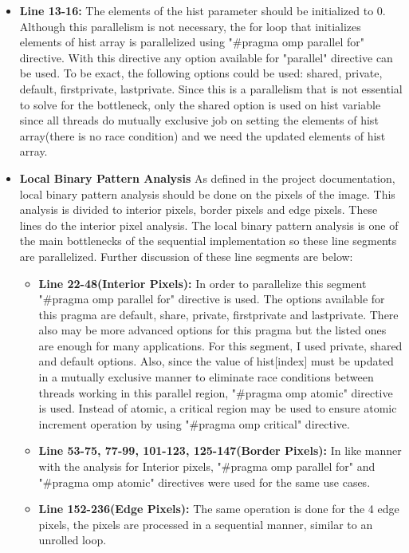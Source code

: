\documentclass{article}
\begin{document}
\begin{itemize}
    \item \textbf{Line 13-16:} The elements of the hist parameter should be initialized to 0. Although this parallelism is not necessary, the for loop that initializes elements of hist array is parallelized using "\#pragma omp parallel for" directive. With this directive any option available for "parallel" directive can be used. To be exact, the following options could be used: shared, private, default, firstprivate, lastprivate. Since this is a parallelism that is not essential to solve for the bottleneck, only the shared option is used on hist variable since all threads do mutually exclusive job on setting the elements of hist array(there is no race condition) and we need the updated elements of hist array.
    \item \textbf{Local Binary Pattern Analysis} As defined in the project documentation, local binary pattern analysis should be done on the pixels of the image. This analysis is divided to interior pixels, border pixels and edge pixels. These lines do the interior pixel analysis. The local binary pattern analysis is one of the main bottlenecks of the sequential implementation so these line segments are parallelized. Further discussion of these line segments are below:
    \begin{itemize}
        \item \textbf{Line 22-48(Interior Pixels):} In order to parallelize this segment "\#pragma omp parallel for" directive is used. The options available for this pragma are default, share, private, firstprivate and lastprivate. There also may be more advanced options for this pragma but the listed ones are enough for many applications. For this segment, I used private, shared and default options. Also, since the value of hist[index] must be updated in a mutually exclusive manner to eliminate race conditions between threads working in this parallel region, "\#pragma omp atomic" directive is used. Instead of atomic, a critical region may be used to ensure atomic increment operation by using "\#pragma omp critical" directive.
        \item \textbf{Line 53-75, 77-99, 101-123, 125-147(Border Pixels):} In like manner with the analysis for Interior pixels, "\#pragma omp parallel for" and "\#pragma omp atomic" directives were used for the same use cases.
        \item \textbf{Line 152-236(Edge Pixels):} The same operation is done for the 4 edge pixels, the pixels are processed in a sequential manner, similar to an unrolled loop.
    \end{itemize}
\end{itemize}
\end{document}
